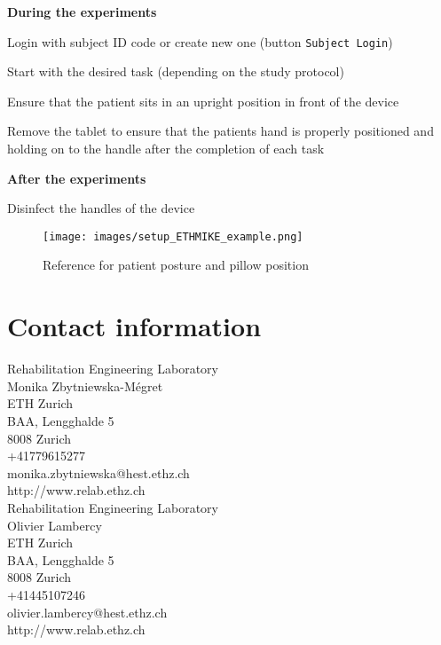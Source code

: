\documentclass[11pt,a4paper]{paper}
\begin{document}
\textbf{During the experiments}
\begin{todolist}
	\setlength\itemsep{-0.25em}
	\item Login with subject ID code or create new one (button \texttt{Subject Login})
	\item Start with the desired task (depending on the study protocol)
	\item Ensure that the patient sits in an upright position in front of the device
	\item Remove the tablet to ensure that the patients hand is properly positioned and holding on to the handle after the completion of each task
\end{todolist}

\textbf{After the experiments}
\begin{todolist}
	\setlength\itemsep{-0.25em}
	\item Disinfect the handles of the device
\end{todolist}

\begin{figure}[H]
    \centering
    \texttt{[image: images/setup\_ETHMIKE\_example.png]}
    \caption{Reference for patient posture and pillow position }
    \label{fig:MIKE_setup}
\end{figure}

\vspace{1cm}

\section*{Contact information}
\label{s:contact_information}

\noindent
Rehabilitation Engineering Laboratory\\
Monika Zbytniewska-Mégret\\
ETH Zurich\\
BAA, Lengghalde 5\\
8008 Zurich\\
+41779615277\\
monika.zbytniewska@hest.ethz.ch\\
http://www.relab.ethz.ch\\

\noindent
Rehabilitation Engineering Laboratory\\
Olivier Lambercy\\
ETH Zurich\\
BAA, Lengghalde 5\\
8008 Zurich\\
+41445107246\\
olivier.lambercy@hest.ethz.ch\\
http://www.relab.ethz.ch\\
\end{document}
